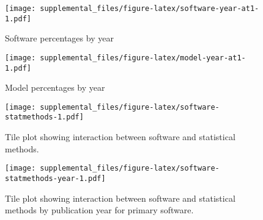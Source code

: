 \documentclass[
  english,
  ,man]{apa6}
\begin{document}
\begin{figure}
\centering
\texttt{[image: supplemental\_files/figure-latex/software-year-at1-1.pdf]}
\caption{\label{fig:software-year-at1}Software percentages by year}
\end{figure}

\begin{figure}
\centering
\texttt{[image: supplemental\_files/figure-latex/model-year-at1-1.pdf]}
\caption{\label{fig:model-year-at1}Model percentages by year}
\end{figure}

\begin{figure}
\centering
\texttt{[image: supplemental\_files/figure-latex/software-statmethods-1.pdf]}
\caption{\label{fig:software-statmethods}Tile plot showing interaction between software and statistical methods.}
\end{figure}

\begin{figure}
\centering
\texttt{[image: supplemental\_files/figure-latex/software-statmethods-year-1.pdf]}
\caption{\label{fig:software-statmethods-year}Tile plot showing interaction between software and statistical methods by publication year for primary software.}
\end{figure}
\end{document}
